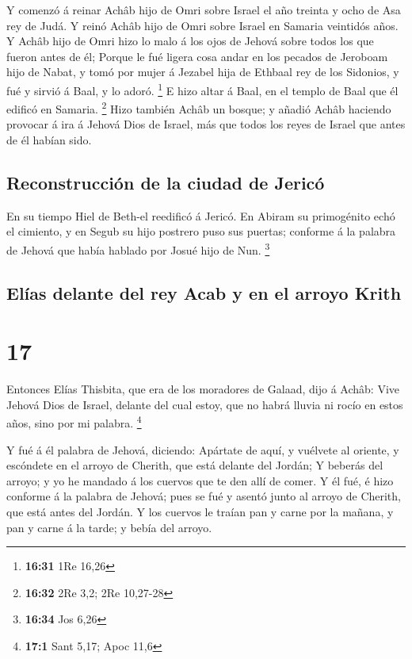  Y comenzó á reinar Achâb hijo de Omri sobre Israel el año
treinta y ocho de Asa rey de Judá.  Y reinó Achâb hijo de
Omri sobre Israel en Samaria veintidós años. Y Achâb hijo de Omri hizo
lo malo á los ojos de Jehová sobre todos los que fueron antes de él;
 Porque le fué ligera cosa andar en los pecados de Jeroboam
hijo de Nabat, y tomó por mujer á Jezabel hija de Ethbaal rey de los
Sidonios, y fué y sirvió á Baal, y lo adoró. \footnote{\textbf{16:31}
  1Re 16,26}  E hizo altar á Baal, en el templo de Baal que
él edificó en Samaria. \footnote{\textbf{16:32} 2Re 3,2; 2Re 10,27-28}
 Hizo también Achâb un bosque; y añadió Achâb haciendo
provocar á ira á Jehová Dios de Israel, más que todos los reyes de
Israel que antes de él habían sido.

\hypertarget{reconstrucciuxf3n-de-la-ciudad-de-jericuxf3}{%
\subsection{Reconstrucción de la ciudad de
Jericó}\label{reconstrucciuxf3n-de-la-ciudad-de-jericuxf3}}

 En su tiempo Hiel de Beth-el reedificó á Jericó. En Abiram
su primogénito echó el cimiento, y en Segub su hijo postrero puso sus
puertas; conforme á la palabra de Jehová que había hablado por Josué
hijo de Nun. \footnote{\textbf{16:34} Jos 6,26}

\hypertarget{eluxedas-delante-del-rey-acab-y-en-el-arroyo-krith}{%
\subsection{Elías delante del rey Acab y en el arroyo
Krith}\label{eluxedas-delante-del-rey-acab-y-en-el-arroyo-krith}}

\hypertarget{section-16}{%
\section{17}\label{section-16}}

 Entonces Elías Thisbita, que era de los moradores de
Galaad, dijo á Achâb: Vive Jehová Dios de Israel, delante del cual
estoy, que no habrá lluvia ni rocío en estos años, sino por mi palabra.
\footnote{\textbf{17:1} Sant 5,17; Apoc 11,6}

 Y fué á él palabra de Jehová, diciendo: 
Apártate de aquí, y vuélvete al oriente, y escóndete en el arroyo de
Cherith, que está delante del Jordán;  Y beberás del arroyo;
y yo he mandado á los cuervos que te den allí de comer.  Y
él fué, é hizo conforme á la palabra de Jehová; pues se fué y asentó
junto al arroyo de Cherith, que está antes del Jordán.  Y
los cuervos le traían pan y carne por la mañana, y pan y carne á la
tarde; y bebía del arroyo.

